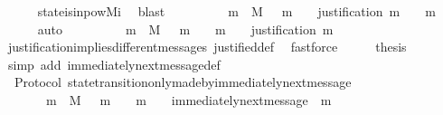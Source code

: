 \begin{isabellebody}
\ \ \ \ \isamarkupfalse%
\ state{\isacharunderscore}is{\isacharunderscore}in{\isacharunderscore}pow{\isacharunderscore}Mi\ \isamarkupfalse%
\ blast\isanewline
\ \ \isamarkupfalse%
\ \isamarkupfalse%
\ {\isachardoublequoteopen}{\isasymforall}\ {\isasymsigma}\ {\isasymin}{\isasymSigma}{\isachardot}\ {\isasymforall}\ m\ {\isasymin}\ M{\isachardot}\ {\isasymsigma}\ {\isasymunion}\ {\isacharbraceleft}m{\isacharbraceright}\ {\isasymin}\ {\isasymSigma}\ {\isasymlongrightarrow}\ justification\ m\ {\isasymsubseteq}\ {\isasymsigma}\ {\isasymunion}\ {\isacharbraceleft}m{\isacharbraceright}{\isachardoublequoteclose}\isanewline
\ \ \ \ \isamarkupfalse%
\ auto\isanewline
\ \ \isamarkupfalse%
\ \isamarkupfalse%
\ {\isachardoublequoteopen}{\isasymforall}\ {\isasymsigma}\ {\isasymin}{\isasymSigma}{\isachardot}\ {\isasymforall}\ m\ {\isasymin}\ M{\isachardot}\ {\isasymsigma}\ {\isasymunion}\ {\isacharbraceleft}m{\isacharbraceright}\ {\isasymin}\ {\isasymSigma}\ {\isasymand}\ m\ {\isasymnotin}\ {\isasymsigma}\ {\isasymlongrightarrow}\ justification\ m\ {\isasymsubseteq}\ {\isasymsigma}{\isachardoublequoteclose}\isanewline
\ \ \ \ \isamarkupfalse%
\ justification{\isacharunderscore}implies{\isacharunderscore}different{\isacharunderscore}messages\ justified{\isacharunderscore}def\ \isamarkupfalse%
\ fastforce\isanewline
\ \ \isamarkupfalse%
\ \isamarkupfalse%
\ {\isacharquery}thesis\isanewline
\ \ \ \ \isamarkupfalse%
\ {\isacharparenleft}simp\ add{\isacharcolon}\ immediately{\isacharunderscore}next{\isacharunderscore}message{\isacharunderscore}def{\isacharparenright}\isanewline
{}\isamarkupfalse%
%
\endisatagproof
{\isafoldproof}%
%
\isadelimproof
\isanewline
%
\endisadelimproof
\isanewline
{}\isamarkupfalse%
\ {\isacharparenleft}\ Protocol{\isacharparenright}\ state{\isacharunderscore}transition{\isacharunderscore}only{\isacharunderscore}made{\isacharunderscore}by{\isacharunderscore}immediately{\isacharunderscore}next{\isacharunderscore}message{\isacharcolon}\ \isanewline
\ \ {\isachardoublequoteopen}{\isasymforall}\ {\isasymsigma}\ {\isasymin}\ {\isasymSigma}{\isachardot}\ {\isasymforall}\ m\ {\isasymin}\ M{\isachardot}\ {\isasymsigma}\ {\isasymunion}\ {\isacharbraceleft}m{\isacharbraceright}\ {\isasymin}\ {\isasymSigma}\ {\isasymand}\ m\ {\isasymnotin}\ {\isasymsigma}\ {\isasymlongleftrightarrow}\ immediately{\isacharunderscore}next{\isacharunderscore}message\ {\isacharparenleft}{\isasymsigma}{\isacharcomma}\ m{\isacharparenright}{\isachardoublequoteclose}\isanewline

\end{isabellebody}
